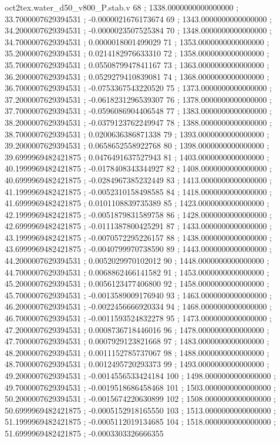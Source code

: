 \begin{filecontents}[overwrite]{oct2tex.water_d50_v800_P.stab.v}
68 ; 1338.0000000000000000 ; 33.7000007629394531 ; -0.0000021676173674
69 ; 1343.0000000000000000 ; 34.2000007629394531 ; -0.0000023507525384
70 ; 1348.0000000000000000 ; 34.7000007629394531 ; 0.0000018001499029
71 ; 1353.0000000000000000 ; 35.2000007629394531 ; 0.0214182976633310
72 ; 1358.0000000000000000 ; 35.7000007629394531 ; 0.0550879947841167
73 ; 1363.0000000000000000 ; 36.2000007629394531 ; 0.0529279410839081
74 ; 1368.0000000000000000 ; 36.7000007629394531 ; -0.0753367543220520
75 ; 1373.0000000000000000 ; 37.2000007629394531 ; -0.0618231296539307
76 ; 1378.0000000000000000 ; 37.7000007629394531 ; -0.0596086904406548
77 ; 1383.0000000000000000 ; 38.2000007629394531 ; -0.0379123762249947
78 ; 1388.0000000000000000 ; 38.7000007629394531 ; 0.0200636386871338
79 ; 1393.0000000000000000 ; 39.2000007629394531 ; 0.0658652558922768
80 ; 1398.0000000000000000 ; 39.6999969482421875 ; 0.0476491637527943
81 ; 1403.0000000000000000 ; 40.1999969482421875 ; -0.0178408343344927
82 ; 1408.0000000000000000 ; 40.6999969482421875 ; -0.0284967385232449
83 ; 1413.0000000000000000 ; 41.1999969482421875 ; -0.0052310158498585
84 ; 1418.0000000000000000 ; 41.6999969482421875 ; 0.0101108839735389
85 ; 1423.0000000000000000 ; 42.1999969482421875 ; -0.0051879831589758
86 ; 1428.0000000000000000 ; 42.6999969482421875 ; -0.0111387800425291
87 ; 1433.0000000000000000 ; 43.1999969482421875 ; -0.0070572295226157
88 ; 1438.0000000000000000 ; 43.6999969482421875 ; -0.0040799970738590
89 ; 1443.0000000000000000 ; 44.2000007629394531 ; 0.0052029970102012
90 ; 1448.0000000000000000 ; 44.7000007629394531 ; 0.0068862466141582
91 ; 1453.0000000000000000 ; 45.2000007629394531 ; 0.0056123477406800
92 ; 1458.0000000000000000 ; 45.7000007629394531 ; -0.0013589009176940
93 ; 1463.0000000000000000 ; 46.2000007629394531 ; -0.0022456666920334
94 ; 1468.0000000000000000 ; 46.7000007629394531 ; -0.0011593524832278
95 ; 1473.0000000000000000 ; 47.2000007629394531 ; 0.0008736718446016
96 ; 1478.0000000000000000 ; 47.7000007629394531 ; 0.0007929123821668
97 ; 1483.0000000000000000 ; 48.2000007629394531 ; 0.0011152785737067
98 ; 1488.0000000000000000 ; 48.7000007629394531 ; 0.0012495720293373
99 ; 1493.0000000000000000 ; 49.2000007629394531 ; -0.0014556533424184
100 ; 1498.0000000000000000 ; 49.7000007629394531 ; -0.0019518686458468
101 ; 1503.0000000000000000 ; 50.2000007629394531 ; -0.0015674220630899
102 ; 1508.0000000000000000 ; 50.6999969482421875 ; -0.0005152918165550
103 ; 1513.0000000000000000 ; 51.1999969482421875 ; -0.0005112019134685
104 ; 1518.0000000000000000 ; 51.6999969482421875 ; -0.0003303326666355

\end{filecontents}
